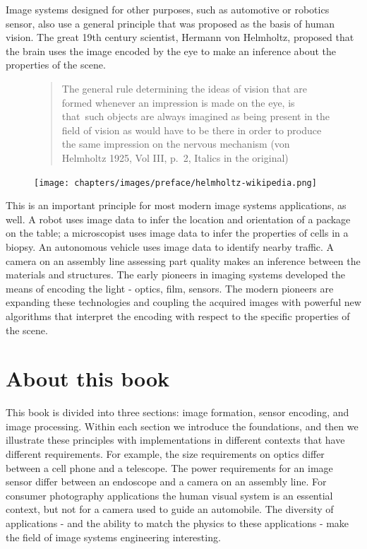 \documentclass[
  letterpaper,
]{book}
\begin{document}
Image systems designed for other purposes, such as automotive or
robotics sensor, also use a general principle that was proposed as the
basis of human vision. The great 19th century scientist, Hermann von
Helmholtz, proposed that the brain uses the image encoded by the eye to
make an inference about the properties of the scene.

\begin{figure}

\begin{minipage}{0.70\linewidth}

\begin{quote}
The general rule determining the ideas of vision that are formed
whenever an impression is made on the eye, is that~such objects are
always imagined as being present in the field of vision as would have to
be there in order to produce the same impression on the nervous
mechanism (von Helmholtz 1925, Vol III, p.~2, Italics in the original)
\end{quote}

\end{minipage}%
%
\begin{minipage}{0.30\linewidth}
\texttt{[image: chapters/images/preface/helmholtz-wikipedia.png]}\end{minipage}%

\end{figure}%

This is an important principle for most modern image systems
applications, as well. A robot uses image data to infer the location and
orientation of a package on the table; a microscopist uses image data to
infer the properties of cells in a biopsy. An autonomous vehicle uses
image data to identify nearby traffic. A camera on an assembly line
assessing part quality makes an inference between the materials and
structures. The early pioneers in imaging systems developed the means of
encoding the light - optics, film, sensors. The modern pioneers are
expanding these technologies and coupling the acquired images with
powerful new algorithms that interpret the encoding with respect to the
specific properties of the scene.

\section*{About this book}\label{about-this-book}


This book is divided into three sections: image formation, sensor
encoding, and image processing. Within each section we introduce the
foundations, and then we illustrate these principles with
implementations in different contexts that have different requirements.
For example, the size requirements on optics differ between a cell phone
and a telescope. The power requirements for an image sensor differ
between an endoscope and a camera on an assembly line. For consumer
photography applications the human visual system is an essential
context, but not for a camera used to guide an automobile. The diversity
of applications - and the ability to match the physics to these
applications - make the field of image systems engineering interesting.
\end{document}

